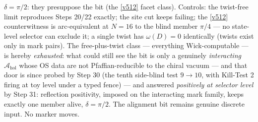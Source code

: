 \documentclass[11pt,a4paper]{article}
\theoremstyle{definition}
\begin{document}
$\delta = \pi/2$: they presuppose the bit (the \vref{v512} facet class). Controls: the
twist-free limit reproduces Steps 20/22 exactly; the site cut keeps failing; the \vref{v512}
counterwitness is arc-equivalent at $N = 16$ to the blind member $\pi/4$ --- no state-level
selector can exclude it; a single twist has $\omega(D) = 0$ identically (twists exist only in
mark pairs). The free-plus-twist class --- everything Wick-computable --- is hereby
\emph{exhausted}: what could still see the bit is only a genuinely \emph{interacting}
$\mathcal A_{\mathrm{hol}}$ whose OS data are not Pfaffian-reducible to the chiral vacuum ---
and that door is since probed by Step 30 (the tenth side-blind test $9\to10$, with Kill-Test 2
firing at toy level under a typed fence) --- and answered \emph{positively at selector level} by
Step 31: reflection positivity, imposed on the interacting mark family, keeps exactly one member
alive, $\delta=\pi/2$.
The alignment bit remains genuine discrete input. No marker moves.
\end{document}
